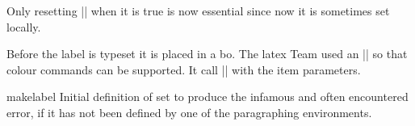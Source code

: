 \begin{texcode}{}{}
    Only resetting |\@nobreak| when it is true is now
    essential since now it is sometimes set locally.
    \begin{teX}
    \if@nobreak
      \@nobreakfalse
      \clubpenalty \@M
    \else
      \clubpenalty \@clubpenalty
      \everypar{}%
    \fi}%
    \end{teX}
    \begin{teX}
  \if@noitemarg
    \@noitemargfalse
    \if@nmbrlist
    \end{teX}
    \begin{teX}
      \@listctr
    \fi
  \fi
    \end{teX}
    
Before the label is typeset it is placed in a bo. The latex Team used an |\sbox| so that colour commands can be supported.
It call |\makelabel| with the item parameters.

    \begin{teX}
  \sbox{}%
  \global\setbox\@labels\hbox{%
    \unhbox\@labels
    \hskip \itemindent
    \hskip -\labelwidth 
    \hskip -\labelsep
    \ifdim \wd\@tempboxa >\labelwidth
       \box\@tempboxa
\end{teX}

\begin{teX}
%
    \else
      \hbox to%
    \fix
    \hskip \labelsep}%
  \ignorespaces}
    \end{teX}
 
 
 
 
 \begin{docCommand}{makelabel}{}
 Initial definition of  set to produce the infamous and often encountered error, if it
 has not been defined by one of the paragraphing environments.
 \end{docCommand}
 

\end{texcode}
